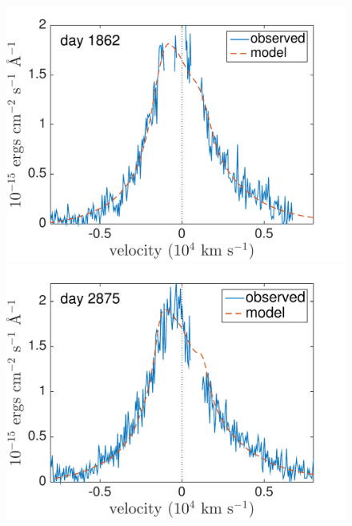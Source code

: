 \begin{figure}
\centering
\includegraphics[trim =0 0 0 0,clip=true,scale=0.37]{chapters/chapter5/images/smooth/best_fit/d1862Ha.pdf}
\hspace{1mm}
\includegraphics[trim =0 0 0 0,clip=true,scale=0.37]{chapters/chapter5/images/smooth/best_fit/d2875Ha.pdf}


\end{figure}
